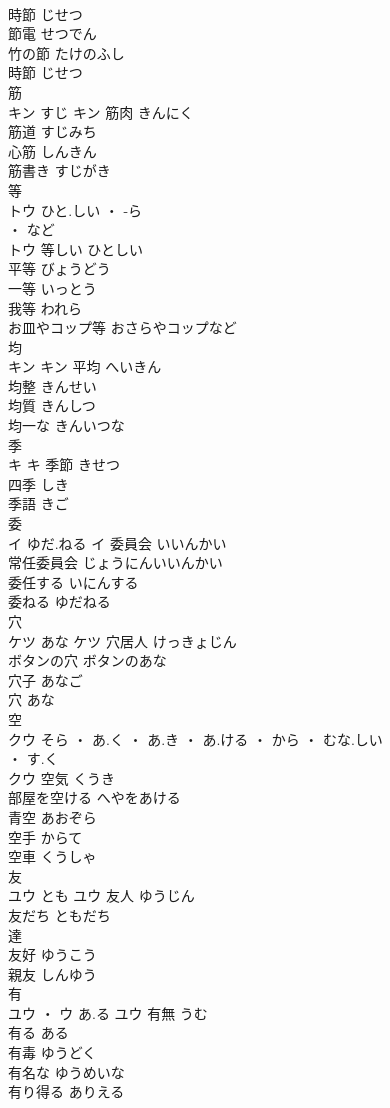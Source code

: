 \documentclass[8pt]{extreport}
\begin{document}
\begin{CJK}{UTF8}{min}
\\	時節	じせつ	
\\	節電	せつでん	
\\	竹の節	たけのふし	
\\	時節	じせつ	
\\	筋	
\\	キン	すじ	キン	筋肉	きんにく	
\\	筋道	すじみち	
\\	心筋	しんきん	
\\	筋書き	すじがき	
\\	等	
\\	トウ	ひと.しい ・ -ら
\\	・ など
\\	トウ	等しい	ひとしい	
\\	平等	びょうどう	
\\	一等	いっとう	
\\	我等	われら	
\\	お皿やコップ等	おさらやコップなど	
\\	均	
\\	キン		キン	平均	へいきん	
\\	均整	きんせい	
\\	均質	きんしつ	
\\	均一な	きんいつな	
\\	季	
\\	キ		キ	季節	きせつ	
\\	四季	しき	
\\	季語	きご	
\\	委	
\\	イ	ゆだ.ねる	イ	委員会	いいんかい	
\\	常任委員会	じょうにんいいんかい	
\\	委任する	いにんする	
\\	委ねる	ゆだねる	
\\	穴	
\\	ケツ	あな	ケツ	穴居人	けっきょじん	
\\	ボタンの穴	ボタンのあな	
\\	穴子	あなご	
\\	穴	あな	
\\	空	
\\	クウ	そら ・ あ.く ・ あ.き ・ あ.ける ・ から ・ むな.しい
\\	・ す.く
\\	クウ	空気	くうき	
\\	部屋を空ける	へやをあける	
\\	青空	あおぞら	
\\	空手	からて	
\\	空車	くうしゃ	
\\	友	
\\	ユウ	とも	ユウ	友人	ゆうじん	
\\	友だち	ともだち	
\\	達 
\\	友好	ゆうこう	
\\	親友	しんゆう	
\\	有	
\\	ユウ ・ ウ	あ.る	ユウ	有無	うむ	
\\	有る	ある	
\\	有毒	ゆうどく	
\\	有名な	ゆうめいな	
\\	有り得る	ありえる	
\end{CJK}
\end{document}
